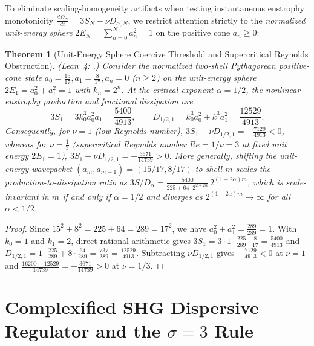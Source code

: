 \documentclass[11pt,a4paper]{article}
\newtheorem{theorem}{Theorem}[section]
\theoremstyle{definition}
\theoremstyle{remark}
\begin{document}
To eliminate scaling-homogeneity artifacts when testing instantaneous enstrophy monotonicity $\frac{d\Omega_N}{dt} = 3S_N - \nu D_{\alpha,N}$, we restrict attention strictly to the \emph{normalized unit-energy sphere} $2E_N = \sum_{n=0}^N a_n^2 = 1$ on the positive cone $a_n \ge 0$:

\begin{theorem}[Unit-Energy Sphere Coercive Threshold and Supercritical Reynolds Obstruction]\label{thm:unit_sphere}
\emph{(Lean~4: .)} Consider the normalized two-shell Pythagorean positive-cone state $a_0 = \frac{15}{17}, a_1 = \frac{8}{17}, a_n = 0$ ($n \ge 2$) on the unit-energy sphere $2E_1 = a_0^2 + a_1^2 = 1$ with $k_n = 2^n$. At the critical exponent $\alpha = 1/2$, the nonlinear enstrophy production and fractional dissipation are
\begin{equation}
3 S_1 = 3 k_0^3 a_0^2 a_1 = \frac{5400}{4913}, \qquad D_{1/2, 1} = k_0^3 a_0^2 + k_1^3 a_1^2 = \frac{12529}{4913}.
\end{equation}
Consequently, for $\nu = 1$ (low Reynolds number), $3S_1 - \nu D_{1/2,1} = -\frac{7129}{4913} < 0$, whereas for $\nu = \frac{1}{3}$ (supercritical Reynolds number $Re = 1/\nu = 3$ at fixed unit energy $2E_1 = 1$), $3S_1 - \nu D_{1/2,1} = +\frac{3671}{14739} > 0$. More generally, shifting the unit-energy wavepacket $(a_m, a_{m+1}) = (15/17, 8/17)$ to shell $m$ scales the production-to-dissipation ratio as $3S / D_\alpha = \frac{5400}{225 + 64\cdot 2^{2+2\alpha}}\, 2^{(1-2\alpha)m}$, which is scale-invariant in $m$ if and only if $\alpha = 1/2$ and diverges as $2^{(1-2\alpha)m} \to \infty$ for all $\alpha < 1/2$.
\end{theorem}
\begin{proof}
Since $15^2 + 8^2 = 225 + 64 = 289 = 17^2$, we have $a_0^2 + a_1^2 = \frac{289}{289} = 1$. With $k_0 = 1$ and $k_1 = 2$, direct rational arithmetic gives $3 S_1 = 3 \cdot 1 \cdot \frac{225}{289} \cdot \frac{8}{17} = \frac{5400}{4913}$ and $D_{1/2,1} = 1 \cdot \frac{225}{289} + 8 \cdot \frac{64}{289} = \frac{737}{289} = \frac{12529}{4913}$. Subtracting $\nu D_{1/2,1}$ gives $-\frac{7129}{4913} < 0$ at $\nu = 1$ and $\frac{16200 - 12529}{14739} = +\frac{3671}{14739} > 0$ at $\nu = 1/3$.
\end{proof}

\section{Complexified SHG Dispersive Regulator and the $\sigma = 3$ Rule}
\end{document}

